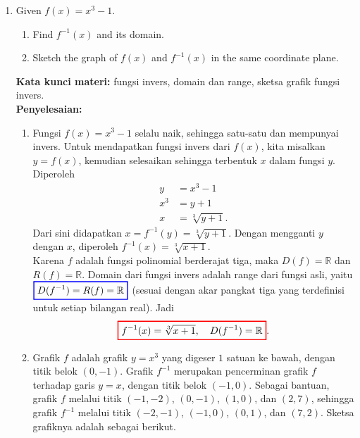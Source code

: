 \documentclass[10pt,openany,a4paper]{article}
\theoremstyle{definition}
\theoremstyle{definition}
\theoremstyle{plain}
\newenvironment{jawab}[2][tes]{%
\par\noindent\textbf{Kata kunci materi:} #1.\\
\textbf{Penyelesaian:} #2%
}{}
\begin{document}
\begin{enumerate}
    \item Given $f(x)=x^3-1$.
    \begin{enumerate}
        \item Find $f^{-1}(x)$ and its domain.
        \item Sketch the graph of $f(x)$ and $f^{-1}(x)$ in the same coordinate plane.
    \end{enumerate}
    \begin{jawab}[fungsi invers, domain dan range, sketsa grafik fungsi invers]{
        \begin{enumerate}
            \item Fungsi $f(x)=x^3-1$ selalu naik, sehingga satu-satu dan mempunyai invers. Untuk mendapatkan fungsi invers dari $f(x)$, kita misalkan $y=f(x)$, kemudian selesaikan sehingga terbentuk $x$ dalam fungsi $y$. Diperoleh
            \begin{align*}
                y &= x^3-1\\
                x^3 &= y+1\\
                x &= \sqrt[3]{y+1}.
            \end{align*}
            Dari sini didapatkan $x = f^{-1}(y) = \sqrt[3]{y+1}$. Dengan mengganti $y$ dengan $x$, diperoleh $f^{-1}(x) = \sqrt[3]{x+1}$.\\
            Karena $f$ adalah fungsi polinomial berderajat tiga, maka $D(f)=\mathbb{R}$ dan $R(f)=\mathbb{R}$. Domain dari fungsi invers adalah range dari fungsi asli, yaitu $\colorlet{oldcolor}{.}
        \color{blue}
        \setlength{\fboxrule}{1pt} \boxed{\color{oldcolor}D(f^{-1}) = R(f) = \mathbb{R}}\color{oldcolor}$ (sesuai dengan akar pangkat tiga yang terdefinisi untuk setiap bilangan real). Jadi
            \begin{align*}
                \colorlet{oldcolor}{.}
        \color{red}
        \setlength{\fboxrule}{1pt} \boxed{\color{oldcolor}f^{-1}(x) = \sqrt[3]{x+1},\quad D(f^{-1})=\mathbb{R}}\color{oldcolor}.
            \end{align*}
            \item Grafik $f$ adalah grafik $y=x^3$ yang digeser $1$ satuan ke bawah, dengan titik belok $(0,-1)$. Grafik $f^{-1}$ merupakan pencerminan grafik $f$ terhadap garis $y=x$, dengan titik belok $(-1,0)$. Sebagai bantuan, grafik $f$ melalui titik $(-1,-2)$, $(0,-1)$, $(1,0)$, dan $(2,7)$, sehingga grafik $f^{-1}$ melalui titik $(-2,-1)$, $(-1,0)$, $(0,1)$, dan $(7,2)$. Sketsa grafiknya adalah sebagai berikut.
            \begin{center}

\end{center}
\end{enumerate}}
\end{jawab}
\end{enumerate}
\end{document}
